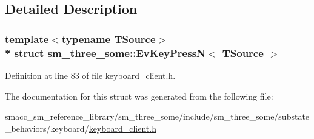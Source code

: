 \subsection{Detailed Description}
\subsubsection*{template$<$typename T\+Source$>$\\*
struct sm\+\_\+three\+\_\+some\+::\+Ev\+Key\+Press\+N$<$ T\+Source $>$}



Definition at line 83 of file keyboard\+\_\+client.\+h.



The documentation for this struct was generated from the following file\+:\begin{DoxyCompactItemize}
\item 
smacc\+\_\+sm\+\_\+reference\+\_\+library/sm\+\_\+three\+\_\+some/include/sm\+\_\+three\+\_\+some/substate\+\_\+behaviors/keyboard/\hyperlink{keyboard__client_8h}{keyboard\+\_\+client.\+h}\end{DoxyCompactItemize}
